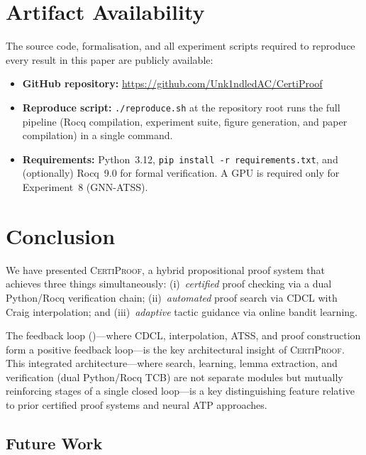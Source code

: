 \documentclass[acmtocl,review,anonymous]{acmart}
\newcommand{\CP}{\textsc{CertiProof}}
\begin{document}
\section*{Artifact Availability}

The source code, formalisation, and all experiment scripts
required to reproduce every result in this paper are publicly
available:

\begin{itemize}
  \item \textbf{GitHub repository:}
    \url{https://github.com/Unk1ndledAC/CertiProof}
  \item \textbf{Reproduce script:}
    \texttt{./reproduce.sh} at the repository root runs the full
    pipeline (Rocq compilation, experiment suite, figure generation,
    and paper compilation) in a single command.
  \item \textbf{Requirements:}
    Python~3.12, \texttt{pip install -r requirements.txt},
    and (optionally) Rocq~9.0 for formal verification.
    A GPU is required only for Experiment~8 (GNN-ATSS).
\end{itemize}

\section{Conclusion}
\label{sec:conclusion}

We have presented \CP{}, a hybrid propositional proof system that
achieves three things simultaneously: (i)~\emph{certified} proof
checking via a dual Python/Rocq verification chain; (ii)~\emph{automated}
proof search via CDCL with Craig interpolation; and
(iii)~\emph{adaptive} tactic guidance via online bandit learning.

The feedback loop ()---where CDCL, interpolation,
ATSS, and proof construction form a positive feedback loop---is the key
architectural insight of \CP{}.  This integrated architecture---where
search, learning, lemma extraction, and verification (dual Python/Rocq TCB)
are not separate modules but mutually reinforcing stages of a single closed
loop---is a key distinguishing feature relative to prior certified proof systems
and neural ATP approaches.

\subsection{Future Work}
\label{sec:future-work}
\end{document}
